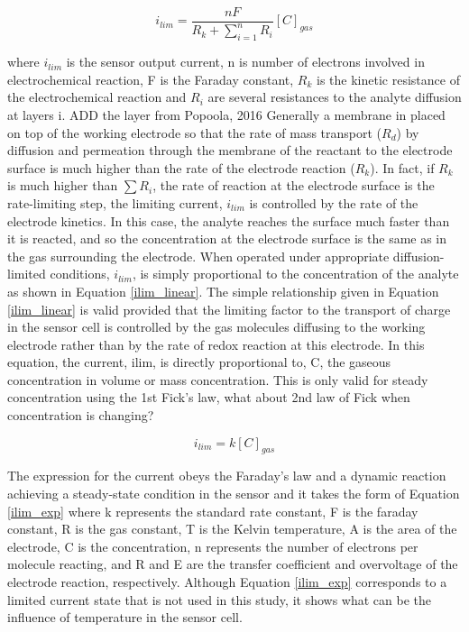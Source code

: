 \documentclass[sensors,article,submit,moreauthors,pdftex]{mdpi}
\begin{document}
\begin{equation}
i_{lim} = \frac {nF}{ R_k + \sum_{i=1}^{n} R_i} [C]_{gas} 
\label{ilim}
\end{equation}

where \(i_{lim}\) is the sensor output current, n is number of electrons
involved in electrochemical reaction, F is the Faraday constant, \(R_k\)
is the kinetic resistance of the electrochemical reaction and \(R_i\)
are several resistances to the analyte diffusion at layers i. ADD the
layer from Popoola, 2016 Generally a membrane in placed on top of the
working electrode so that the rate of mass transport (\(R_d\)) by
diffusion and permeation through the membrane of the reactant to the
electrode surface is much higher than the rate of the electrode reaction
(\(R_k\)). In fact, if \(R_k\) is much higher than \(\sum R_i\), the
rate of reaction at the electrode surface is the rate-limiting step, the
limiting current, \(i_{lim}\) is controlled by the rate of the electrode
kinetics. In this case, the analyte reaches the surface much faster than
it is reacted, and so the concentration at the electrode surface is the
same as in the gas surrounding the electrode. When operated under
appropriate diffusion-limited conditions, \(i_{lim}\), is simply
proportional to the concentration of the analyte
\citep{helm_measurement_2010} as shown in Equation \eqref{ilim_linear}.
The simple relationship given in Equation \eqref{ilim_linear} is valid
provided that the limiting factor to the transport of charge in the
sensor cell is controlled by the gas molecules diffusing to the working
electrode rather than by the rate of redox reaction at this electrode.
In this equation, the current, ilim, is directly proportional to, C, the
gaseous concentration in volume or mass concentration. This is only
valid for steady concentration using the 1st Fick's law, what about 2nd
law of Fick when concentration is changing?

\begin{equation}
i_{lim} =  k [C]_{gas} 
\label{ilim_linear}
\end{equation}

The expression for the current obeys the Faraday's law and a dynamic
reaction achieving a steady-state condition in the sensor and it takes
the form of Equation \eqref{ilim_exp} where k represents the standard
rate constant, F is the faraday constant, R is the gas constant, T is
the Kelvin temperature, A is the area of the electrode, C is the
concentration, n represents the number of electrons per molecule
reacting, and R and E are the transfer coefficient and overvoltage of
the electrode reaction, respectively. Although Equation \eqref{ilim_exp}
corresponds to a limited current state that is not used in this study,
it shows what can be the influence of temperature in the sensor cell.
\end{document}
